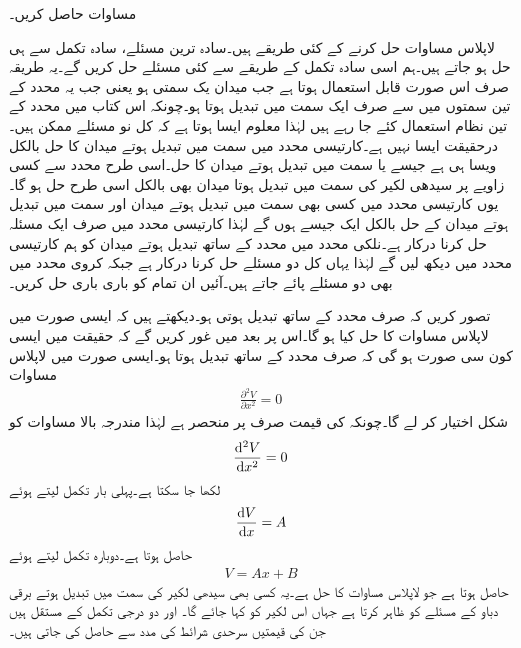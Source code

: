 مساوات  حاصل کریں۔

لاپلاس مساوات حل کرنے کے کئی طریقے ہیں۔سادہ ترین مسئلے، سادہ تکمل سے ہی حل ہو جاتے ہیں۔ہم اسی سادہ تکمل کے طریقے سے کئی مسئلے حل کریں گے۔یہ طریقہ صرف اس صورت قابل استعمال ہوتا ہے جب میدان یک سمتی ہو یعنی جب یہ محدد کے تین سمتوں میں سے صرف ایک سمت میں تبدیل ہوتا ہو۔چونکہ اس کتاب میں محدد کے تین نظام استعمال کئے جا رہے ہیں لہٰذا معلوم ایسا ہوتا ہے کہ  کل نو مسئلے ممکن ہیں۔درحقیقت ایسا نہیں ہے۔کارتیسی محدد میں  سمت میں تبدیل ہوتے میدان کا حل بالکل ویسا ہی ہے جیسے  یا  سمت میں تبدیل ہوتے میدان کا حل۔اسی طرح  محدد سے کسی زاویے پر سیدھی لکیر کی سمت میں تبدیل ہوتا میدان بھی بالکل اسی طرح حل ہو گا۔یوں کارتیسی محدد میں کسی بھی سمت میں تبدیل ہوتے میدان اور  سمت میں تبدیل ہوتے میدان کے حل بالکل ایک جیسے ہوں گے لہٰذا کارتیسی محدد میں صرف ایک مسئلہ حل کرنا درکار ہے۔نلکی محدد میں  محدد کے ساتھ تبدیل ہوتے میدان کو ہم کارتیسی محدد میں دیکھ لیں گے لہٰذا یہاں کل دو مسئلے حل کرنا درکار ہے جبکہ کروی محدد میں بھی دو مسئلے پائے جاتے ہیں۔آئیں ان تمام کو باری باری حل کریں۔

تصور کریں کہ  صرف  محدد کے ساتھ تبدیل ہوتی ہو۔دیکھتے ہیں کہ ایسی صورت میں لاپلاس مساوات کا حل کیا ہو گا۔اس پر بعد میں غور کریں گے کہ حقیقت میں ایسی کون سی صورت ہو گی کہ  صرف  محدد کے ساتھ تبدیل ہوتا ہو۔ایسی صورت میں لاپلاس مساوات
\begin{align*}
\frac{\partial^2 V}{\partial x^2}=0
\end{align*}
شکل اختیار کر لے گا۔چونکہ  کی قیمت صرف  پر منحصر ہے لہٰذا مندرجہ بالا مساوات کو
\begin{align*}
\frac{\dif{\hspace{0.1pt} ^2} V}{\dif x^2}=0
\end{align*}
لکھا جا سکتا ہے۔پہلی بار تکمل لیتے ہوئے
\begin{align*}
\frac{\dif V}{\dif x}=A
\end{align*}
حاصل ہوتا ہے۔دوبارہ تکمل لیتے ہوئے
\begin{align}\label{مساوات_لاپلاس_کارتیسی_حل}
V=Ax+B
\end{align}
حاصل ہوتا ہے جو لاپلاس مساوات کا حل ہے۔یہ کسی بھی سیدھی لکیر کی سمت میں تبدیل ہوتے برقی دباو کے مسئلے کو ظاہر کرتا ہے جہاں اس لکیر کو  کہا جائے گا۔ اور  دو درجی تکمل کے مستقل ہیں جن کی قیمتیں سرحدی شرائط کی مدد سے حاصل کی جاتی ہیں۔

